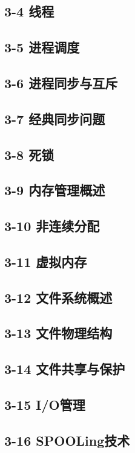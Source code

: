 \documentclass[10pt, aspectratio=169]{beamer}
\begin{document}
\subsection{3-4 线程}


\subsection{3-5 进程调度}


\subsection{3-6 进程同步与互斥}


\subsection{3-7 经典同步问题}


\subsection{3-8 死锁}


\subsection{3-9 内存管理概述}


\subsection{3-10 非连续分配}


\subsection{3-11 虚拟内存}


\subsection{3-12 文件系统概述}


\subsection{3-13 文件物理结构}


\subsection{3-14 文件共享与保护}


\subsection{3-15 I/O管理}


\subsection{3-16 SPOOLing技术}

\end{document}
